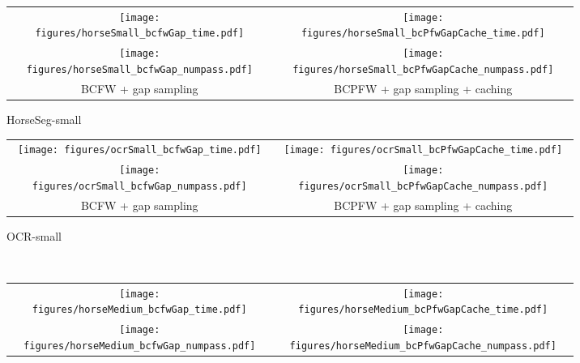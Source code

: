 \documentclass{article}
\begin{document}
%
%
%
%
%
%
%
%
%
%
%
%
%
%
%
%
%
%
%
%
%
%
%
%
%
%
%
%
%
%
%
%
%

\clearpage
\begin{figure*}
\centering
\begin{subfigure}[b]{0.48\textwidth}
    \begin{tabular}{c@{$\:$}c}
        \texttt{[image: figures/horseSmall\_bcfwGap\_time.pdf]} &
        \texttt{[image: figures/horseSmall\_bcPfwGapCache\_time.pdf]}\\
        \texttt{[image: figures/horseSmall\_bcfwGap\_numpass.pdf]} &
        \texttt{[image: figures/horseSmall\_bcPfwGapCache\_numpass.pdf]}\\
        {\scriptsize BCFW + gap sampling}
        &
        {\scriptsize BCPFW + gap sampling + caching}
        \\[-0.0cm]
    \end{tabular}
    \caption{
        \label{fig:regPath_horseSmall} HorseSeg-small
        }
\end{subfigure}
\quad
\begin{subfigure}[b]{0.48\textwidth}
    \begin{tabular}{c@{$\:$}c}
        \texttt{[image: figures/ocrSmall\_bcfwGap\_time.pdf]} &
        \texttt{[image: figures/ocrSmall\_bcPfwGapCache\_time.pdf]}\\
        \texttt{[image: figures/ocrSmall\_bcfwGap\_numpass.pdf]} &
        \texttt{[image: figures/ocrSmall\_bcPfwGapCache\_numpass.pdf]}\\
        {\scriptsize BCFW + gap sampling}
        &
        {\scriptsize BCPFW + gap sampling + caching}
        \\[-0.0cm]
    \end{tabular}
    \caption{
        \label{fig:regPath_ocrSmall} OCR-small
        }
\end{subfigure}
\\[5mm]
\begin{subfigure}[b]{0.48\textwidth}
    \begin{tabular}{c@{$\:$}c}
        \texttt{[image: figures/horseMedium\_bcfwGap\_time.pdf]} &
        \texttt{[image: figures/horseMedium\_bcPfwGapCache\_time.pdf]}\\
        \texttt{[image: figures/horseMedium\_bcfwGap\_numpass.pdf]} &
        \texttt{[image: figures/horseMedium\_bcPfwGapCache\_numpass.pdf]}\\

\end{tabular}
\end{subfigure}
\end{figure*}
\end{document}
